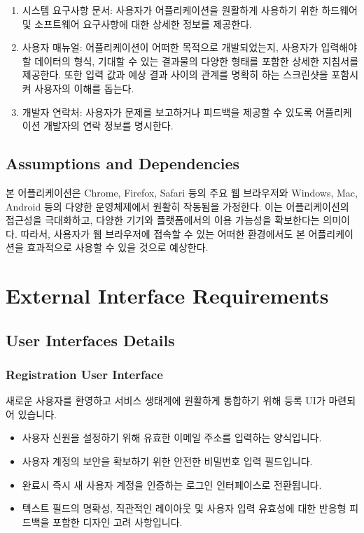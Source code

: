 \documentclass[a4paper, 12pt]{article}
\begin{document}
\begin{enumerate}
  \item 시스템 요구사항 문서: 사용자가 어플리케이션을 원활하게 사용하기 위한 하드웨어 및 소프트웨어 요구사항에 대한 상세한 정보를 제공한다.
  \item 사용자 매뉴얼: 어플리케이션이 어떠한 목적으로 개발되었는지, 사용자가 입력해야 할 데이터의 형식, 기대할 수 있는 결과물의 다양한 형태를 포함한 상세한 지침서를 제공한다. 또한 입력 값과 예상 결과 사이의 관계를 명확히 하는 스크린샷을 포함시켜 사용자의 이해를 돕는다.
  \item 개발자 연락처: 사용자가 문제를 보고하거나 피드백을 제공할 수 있도록 어플리케이션 개발자의 연락 정보를 명시한다.
\end{enumerate}

\subsection{Assumptions and Dependencies}
본 어플리케이션은 Chrome, Firefox, Safari 등의 주요 웹 브라우저와 Windows, Mac, Android 등의 다양한 운영체제에서 원활히 작동됨을 가정한다. 이는 어플리케이션의 접근성을 극대화하고, 다양한 기기와 플랫폼에서의 이용 가능성을 확보한다는 의미이다. 따라서, 사용자가 웹 브라우저에 접속할 수 있는 어떠한 환경에서도 본 어플리케이션을 효과적으로 사용할 수 있을 것으로 예상한다.

\section{External Interface Requirements}

\subsection{User Interfaces Details}

\subsubsection{Registration User Interface}

새로운 사용자를 환영하고 서비스 생태계에 원활하게 통합하기 위해 등록 UI가 마련되어 있습니다.

\begin{itemize}
\item 사용자 신원을 설정하기 위해 유효한 이메일 주소를 입력하는 양식입니다.
\item 사용자 계정의 보안을 확보하기 위한 안전한 비밀번호 입력 필드입니다.
\item 완료시 즉시 새 사용자 계정을 인증하는 로그인 인터페이스로 전환됩니다.
\item 텍스트 필드의 명확성, 직관적인 레이아웃 및 사용자 입력 유효성에 대한 반응형 피드백을 포함한 디자인 고려 사항입니다.
\end{itemize}
\end{document}
